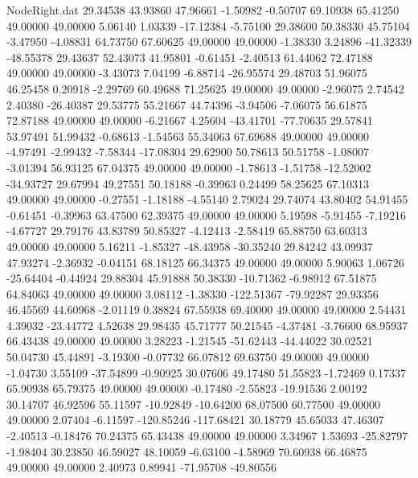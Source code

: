 \begin{filecontents}{NodeRight.dat}
  29.34538   43.93860   47.96661    -1.50982   -0.50707   69.10938   65.41250   49.00000   49.00000    5.06140    1.03339  -17.12384   -5.75100
  29.38600   50.38330   45.75104    -3.47950   -4.08831   64.73750   67.60625   49.00000   49.00000   -1.38330    3.24896  -41.32339  -48.55378
  29.43637   52.43073   41.95801    -0.61451   -2.40513   61.44062   72.47188   49.00000   49.00000   -3.43073    7.04199   -6.88714  -26.95574
  29.48703   51.96075   46.25458     0.20918   -2.29769   60.49688   71.25625   49.00000   49.00000   -2.96075    2.74542    2.40380  -26.40387
  29.53775   55.21667   44.74396    -3.94506   -7.06075   56.61875   72.87188   49.00000   49.00000   -6.21667    4.25604  -43.41701  -77.70635
  29.57841   53.97491   51.99432    -0.68613   -1.54563   55.34063   67.69688   49.00000   49.00000   -4.97491   -2.99432   -7.58344  -17.08304
  29.62900   50.78613   50.51758    -1.08007   -3.01394   56.93125   67.04375   49.00000   49.00000   -1.78613   -1.51758  -12.52002  -34.93727
  29.67994   49.27551   50.18188    -0.39963    0.24499   58.25625   67.10313   49.00000   49.00000   -0.27551   -1.18188   -4.55140    2.79024
  29.74074   43.80402   54.91455    -0.61451   -0.39963   63.47500   62.39375   49.00000   49.00000    5.19598   -5.91455   -7.19216   -4.67727
  29.79176   43.83789   50.85327    -4.12413   -2.58419   65.88750   63.60313   49.00000   49.00000    5.16211   -1.85327  -48.43958  -30.35240
  29.84242   43.09937   47.93274    -2.36932   -0.04151   68.18125   66.34375   49.00000   49.00000    5.90063    1.06726  -25.64404   -0.44924
  29.88304   45.91888   50.38330   -10.71362   -6.98912   67.51875   64.84063   49.00000   49.00000    3.08112   -1.38330 -122.51367  -79.92287
  29.93356   46.45569   44.60968    -2.01119    0.38824   67.55938   69.40000   49.00000   49.00000    2.54431    4.39032  -23.44772    4.52638
  29.98435   45.71777   50.21545    -4.37481   -3.76600   68.95937   66.43438   49.00000   49.00000    3.28223   -1.21545  -51.62443  -44.44022
  30.02521   50.04730   45.44891    -3.19300   -0.07732   66.07812   69.63750   49.00000   49.00000   -1.04730    3.55109  -37.54899   -0.90925
  30.07606   49.17480   51.55823    -1.72469    0.17337   65.90938   65.79375   49.00000   49.00000   -0.17480   -2.55823  -19.91536    2.00192
  30.14707   46.92596   55.11597   -10.92849  -10.64200   68.07500   60.77500   49.00000   49.00000    2.07404   -6.11597 -120.85246 -117.68421
  30.18779   45.65033   47.46307    -2.40513   -0.18476   70.24375   65.43438   49.00000   49.00000    3.34967    1.53693  -25.82797   -1.98404
  30.23850   46.59027   48.10059    -6.63100   -4.58969   70.60938   66.46875   49.00000   49.00000    2.40973    0.89941  -71.95708  -49.80556

\end{filecontents}
